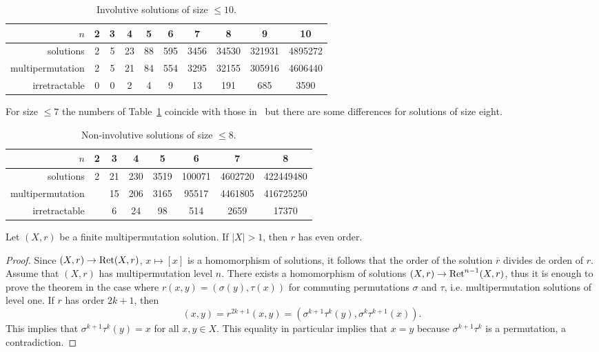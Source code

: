 \begin{example}

\end{example}

\begin{table}[H]
\centering
\caption{Involutive solutions of size $\leq10$.}
\begin{tabular}{|r|ccccccccc|}
\hline
$n$ & 2 & 3 & 4 & 5 & 6 & 7 & 8 & 9 & 10\tabularnewline
\hline 
solutions & 2 & 5 & 23 & 88 & 595 & 3456 & 34530 & 321931 & 4895272\tabularnewline
multipermutation & 2 & 5 & 21 & 84 & 554 & 3295 & 32155 & 305916 & 4606440\tabularnewline
irretractable & 0 & 0 & 2 & 4 & 9 & 13 & 191 & 685 & 3590\tabularnewline
\hline
\end{tabular}
\label{tab:INV_mp}
\end{table}

For size $\leq7$ the numbers of Table~\ref{tab:INV_mp} coincide with those in~\cite{MR1722951}
but there are some differences for solutions of size eight. 

\begin{table}[H]
\centering
\caption{Non-involutive solutions of size $\leq8$.}
\begin{tabular}{|r|ccccccc|}
\hline
$n$ & 2 & 3 & 4 & 5 & 6 & 7 & 8 \tabularnewline
\hline 
solutions & 2 & 21 & 230 & 3519 & 100071 & 4602720  & 422449480 \tabularnewline
multipermutation &  & 15 & 206 & 3165 & 95517 & 4461805 & 416725250 \tabularnewline
irretractable & & 6 & 24 & 98 & 514 & 2659 & 17370\tabularnewline
\hline
\end{tabular}
\label{tab:mp}
\end{table}


\begin{theorem}
\label{thm:CJKAV}
    Let $(X,r)$ be a finite multipermutation solution. If $|X|>1$, then $r$ has even order. 
\end{theorem}

\begin{proof}
    Since $(X,r)\to\operatorname{Ret}(X,r)$, $x\mapsto[x]$ is a homomorphism of solutions, 
    it follows that the order of the solution $\overline{r}$ divides de orden of $r$. 
    Assume that $(X,r)$ has multipermutation level $n$. 
    There exists a homomorphism of solutions $(X,r)\to\operatorname{Ret}^{n-1}(X,r)$, thus 
    it is enough to prove the theorem in the case where
    $r(x,y)=(\sigma(y),\tau(x))$ for commuting permutations $\sigma$ and $\tau$, i.e. 
    multipermutation solutions of level one. If $r$ has order $2k+1$, then 
    \[
    (x,y)=r^{2k+1}(x,y)=(\sigma^{k+1}\tau^k(y),\sigma^k\tau^{k+1}(x)).
    \]
    This implies that $\sigma^{k+1}\tau^k(y)=x$ for all $x,y\in X$. This equality in particular 
    implies that $x=y$ because $\sigma^{k+1}\tau^k$ is a permutation, a contradiction. 
\end{proof}


